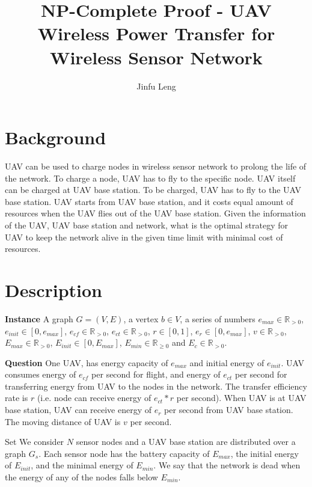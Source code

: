 \usepackage{amsfonts}


\title{NP-Complete Proof - UAV Wireless Power Transfer for Wireless Sensor Network}
\author{Jinfu Leng}
\maketitle
\section{Background}
UAV can be used to charge nodes in wireless sensor network to prolong the life of the network. To charge a node, UAV has to fly to the specific node. UAV itself can be charged at UAV base station. To be charged, UAV has to fly to the UAV base station. UAV starts from UAV base station, and it costs equal amount of resources when the UAV flies out of the UAV base station. Given the information of the UAV, UAV base station and network, what is the optimal strategy for UAV to keep the network alive in the given time limit with minimal cost of resources.

\section{Description}
\textbf{Instance} 
A graph $G = (V, E)$, a vertex $b \in V$, a series of numbers $e_{max} \in \mathbb{R}_{>0}$, $e_{init} \in [0, e_{max}]$, $e_{cf} \in \mathbb{R}_{>0}$, $e_{ct} \in \mathbb{R}_{>0}$, $r \in [0, 1]$, $e_r \in [0, e_{max}]$, $v \in \mathbb{R}_{>0}$, $E_{max} \in \mathbb{R}_{>0}$, $E_{init} \in [0, E_{max}]$, $E_{min} \in \mathbb{R}_{\geq 0}$ and $E_{c} \in \mathbb{R}_{>0}$.

\textbf{Question} 
One UAV, has energy capacity of $e_{max}$ and initial energy of $e_{init}$. UAV consumes energy of $e_{cf}$ per second for flight, and energy of $e_{ct}$ per second for transferring energy from UAV to the nodes in the network. The transfer efficiency rate is $r$ (i.e. node can receive energy of $e_{ct}*r$ per second). When UAV is at UAV base station, UAV can receive energy of $e_r$ per second from UAV base station. The moving distance of UAV is $v$ per second.

Set
We consider $N$ sensor nodes and a UAV base station are distributed over a graph $G_s$. Each sensor node has the battery capacity of $E_{max}$, the initial energy of $E_{init}$, and the minimal energy of $E_{min}$. We say that the network is dead when the energy of any of the nodes falls below $E_{min}$. 

